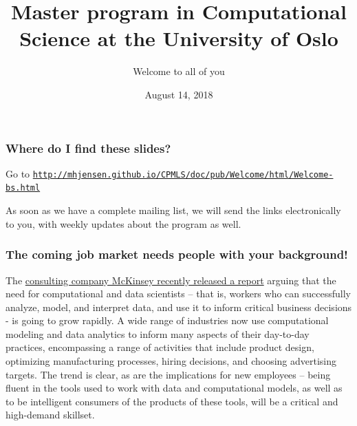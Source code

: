 \documentclass{beamer}
\begin{document}

\newcommand{\exercisesection}[1]{\subsection*{#1}}







\title{Master program in Computational Science  at the University of Oslo}


\author{Welcome to all of you\inst{}}
\institute{}


\date{August 14, 2018
}

\begin{frame}
\titlepage
\end{frame}

\begin{frame}
\frametitle{Where do I find these slides?}

\begin{block}{}
Go to \href{{http://mhjensen.github.io/CPMLS/doc/pub/Welcome/html/Welcome-bs.html}}{\nolinkurl{http://mhjensen.github.io/CPMLS/doc/pub/Welcome/html/Welcome-bs.html}}

As soon as we have a complete mailing list, we will send the links electronically to you, with weekly updates about the program as well.
\end{block}
\end{frame}

\begin{frame}
\frametitle{The coming job market needs people with your background!}

\begin{block}{}
The \href{{https://www.mckinsey.com/business-functions/mckinsey-analytics/our-insights/the-age-of-analytics-competing-in-a-data-driven-world}}{consulting company McKinsey recently released a report} arguing that the need for computational and data scientists – that is,
workers who can successfully analyze, model, and interpret data, and use it to inform critical business
decisions - is going to grow rapidly. A wide range of industries now use computational
modeling and data analytics to inform many aspects of their day-to-day practices, encompassing
a range of activities that include product design, optimizing manufacturing processes, hiring decisions,
and choosing advertising targets. The trend is clear, as are the implications for new employees
– being fluent in the tools used to work with data and computational models, as well as to be
intelligent consumers of the products of these tools, will be a critical and high-demand skillset.
\end{block}
\end{frame}
\end{document}
